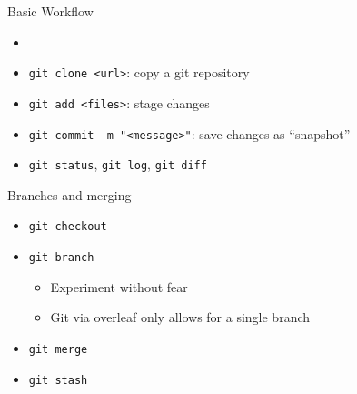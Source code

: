 \documentclass[12pt,t]{beamer}
\begin{document}
\begin{frame}{Basic Workflow}
\begin{itemize}
	\item 
	\pause {}
		\pause
		\vspace{1em}
    \item \texttt{git clone <url>}:  copy a git repository
		\pause
		\vspace{1em}
    \item \texttt{git add <files>}:  stage changes
		\pause
		\vspace{1em}
    \item \texttt{git commit -m "<message>"}: save changes as ``snapshot'' 
		\pause
		\vspace{1em}
    \item \texttt{git status}, \texttt{git log}, \texttt{git diff}
\end{itemize}
\end{frame}



\begin{frame}{Branches and merging}
\begin{itemize}
		\vspace{1em}
    \item \texttt{git checkout} 
		\pause
		\vspace{1em}
	\item \texttt{git branch}
		\pause
		\begin{itemize}
			\item Experiment without fear
				\pause
			\item Git via overleaf only allows for a single branch
				\pause 
		\end{itemize}
		\vspace{1em}
	\item \texttt{git merge}
		\pause
		\vspace{1em}
	\item \texttt{git stash}
		\pause
		\vspace{1em}
\end{itemize}
\end{frame}
\end{document}
